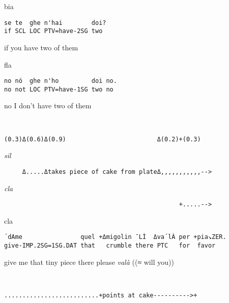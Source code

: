 \documentclass[output=paper,modfonts]{langscibook}
\begin{document}
\vspace{2mm}
%
\begin{transbox}{1}{bia}
\begin{verbatim}
se te  ghe n'hai        doi?
if SCL LOC PTV=have-2SG two
\end{verbatim}
if you have two of them
\end{transbox}\vspace{1mm}
%
\begin{transbox}{2}{fla}
\begin{verbatim}
no nó  ghe n'ho         doi no.
no not LOC PTV=have-1SG two no
\end{verbatim}
no I don't have two of them
\end{transbox}\vspace{2mm}
%
\begin{transbox}{3}{~}
\begin{verbatim}
(0.3)Δ(0.6)Δ(0.9)                         Δ(0.2)+(0.3)
\end{verbatim}
\end{transbox}
%
\begin{transbox}{4}{\textit{sil}}
\begin{verbatim}
     Δ.....Δtakes piece of cake from plateΔ,,,,,,,,,,,-->
\end{verbatim}
\end{transbox}
%
\begin{transbox}{5}{\textit{cla}}
\begin{verbatim}
                                                +.....-->
\end{verbatim}
\end{transbox}\vspace{-0.5mm}
%
\begin{mdframednoverticalspace}[style=firstfoc]
\begin{transbox}{6}{cla}
\begin{verbatim}
´dAme                quel +Δmigolin ¯LÌ  Δva´lÀ per +pia↘ZER.
give-IMP.2SG=1SG.DAT that   crumble there PTC   for  favor
\end{verbatim}
give me that tiny piece there please \textit{valà} ((≈ will you))
\end{transbox}
\end{mdframednoverticalspace}\vspace{1.5mm}
%
\begin{transbox}{7}{~}
\begin{verbatim}
..........................+points at cake---------->+
\end{verbatim}
\end{transbox}
\end{document}
